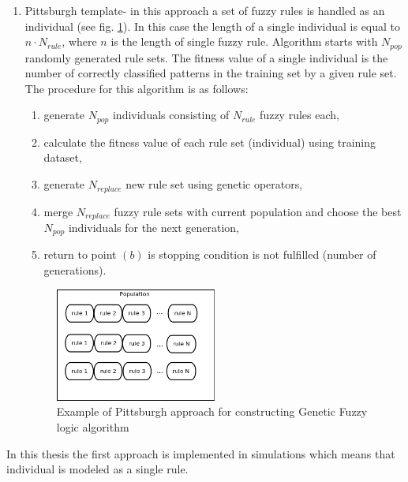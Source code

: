 \begin{enumerate}
    \item Pittsburgh template- in this approach a set of fuzzy rules is handled
        as an individual (see fig. \ref{fig:p}). In this case the length of a single individual is
        equal to $n\cdot N_{rule}$, where $n$ is the length of single fuzzy rule.
        Algorithm starts with $N_{pop}$ randomly generated rule sets. The
        fitness value of a single individual is the number of correctly
        classified patterns in the training set by a given rule set.
        The procedure for this algorithm is as follows:
        \begin{enumerate}
            \item generate $N_{pop}$ individuals consisting of $N_{rule}$ fuzzy
                rules each,
            \item calculate the fitness value of each rule set (individual)
                using training dataset,
            \item generate $N_{replace}$ new rule set using genetic operators,
            \item merge $N_{replace}$ fuzzy rule sets  with current population and
                choose the best $N_{pop}$ individuals for the next generation,
            \item return to point $(b)$ is stopping condition is not fulfilled
                (number of generations).
        \end{enumerate}
        \begin{figure}[H]
            \begin{center}
                \includegraphics[width=0.5\textwidth, height=0.4\textwidth]{fig/pittsburgh.png}
            \end{center}
            \caption{Example of Pittsburgh approach for constructing Genetic Fuzzy logic algorithm}
            \label{fig:p}
        \end{figure}
\end{enumerate}
In this thesis the first approach is implemented in simulations which means that
individual is modeled as a single rule. 

